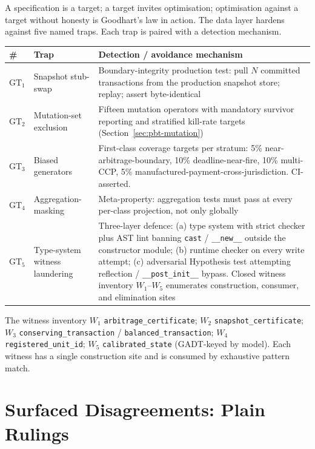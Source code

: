 \documentclass[11pt,a4paper]{article}
\begin{document}
A specification is a target; a target invites optimisation; optimisation against a target without honesty is Goodhart's law in action. The data layer hardens against five named traps. Each trap is paired with a detection mechanism.

\begin{center}
\renewcommand{\arraystretch}{1.15}
\begin{tabular}{@{}p{0.8cm}p{4.5cm}p{9.5cm}@{}}
\toprule
\textbf{\#} & \textbf{Trap} & \textbf{Detection / avoidance mechanism} \\
\midrule
$\mathrm{GT}_1$ & Snapshot stub-swap & Boundary-integrity production test: pull $N$ committed transactions from the production snapshot store; replay; assert byte-identical \\
$\mathrm{GT}_2$ & Mutation-set exclusion & Fifteen mutation operators with mandatory survivor reporting and stratified kill-rate targets (Section~\ref{sec:pbt-mutation}) \\
$\mathrm{GT}_3$ & Biased generators & First-class coverage targets per stratum: 5\% near-arbitrage-boundary, 10\% deadline-near-fire, 10\% multi-CCP, 5\% manufactured-payment-cross-jurisdiction. CI-asserted. \\
$\mathrm{GT}_4$ & Aggregation-masking & Meta-property: aggregation tests must pass at every per-class projection, not only globally \\
$\mathrm{GT}_5$ & Type-system witness laundering & Three-layer defence: (a) type system with strict checker plus AST lint banning \texttt{cast} / \texttt{\_\_new\_\_} outside the constructor module; (b) runtime checker on every write attempt; (c) adversarial Hypothesis test attempting reflection / \texttt{\_\_post\_init\_\_} bypass. Closed witness inventory $W_1$--$W_5$ enumerates construction, consumer, and elimination sites \\
\bottomrule
\end{tabular}
\end{center}

The witness inventory $W_1$ \texttt{arbitrage\_certificate}; $W_2$ \texttt{snapshot\_certificate}; $W_3$ \texttt{conserving\_transaction} / \texttt{balanced\_transaction}; $W_4$ \texttt{registered\_unit\_id}; $W_5$ \texttt{calibrated\_state} (GADT-keyed by model). Each witness has a single construction site and is consumed by exhaustive pattern match.

\clearpage
\section{Surfaced Disagreements: Plain Rulings}
\label{sec:disagreements}
\end{document}
